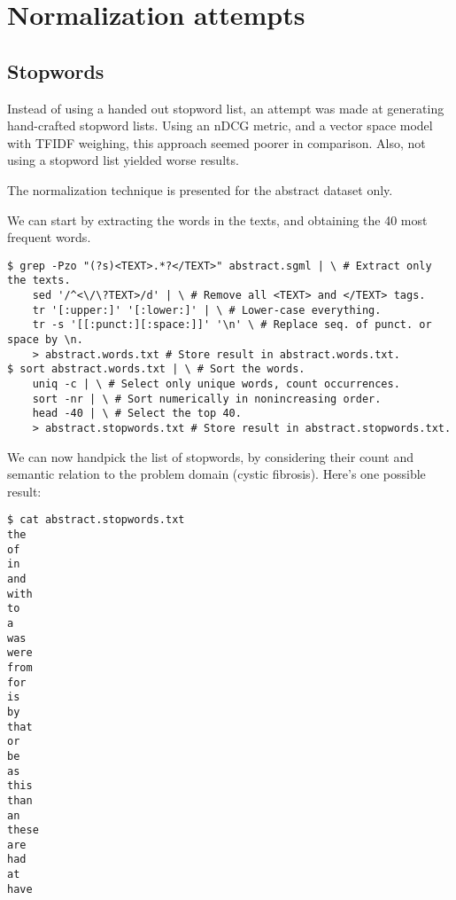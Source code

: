 
\section{Normalization attempts}

\subsection{Stopwords}

Instead of using a handed out stopword list, an attempt was made at generating
hand-crafted stopword lists. Using an nDCG metric, and a vector space model
with TFIDF weighing, this approach seemed poorer in comparison. Also, not using
a stopword list yielded worse results.

The normalization technique is presented for the abstract dataset only.

We can start by extracting the words in the texts, and obtaining the 40 most
frequent words.


\begin{lstlisting}
$ grep -Pzo "(?s)<TEXT>.*?</TEXT>" abstract.sgml | \ # Extract only the texts.
    sed '/^<\/\?TEXT>/d' | \ # Remove all <TEXT> and </TEXT> tags.
    tr '[:upper:]' '[:lower:]' | \ # Lower-case everything.
    tr -s '[[:punct:][:space:]]' '\n' \ # Replace seq. of punct. or space by \n.
    > abstract.words.txt # Store result in abstract.words.txt.
$ sort abstract.words.txt | \ # Sort the words.
    uniq -c | \ # Select only unique words, count occurrences.
    sort -nr | \ # Sort numerically in nonincreasing order.
    head -40 | \ # Select the top 40.
    > abstract.stopwords.txt # Store result in abstract.stopwords.txt.
\end{lstlisting}

We can now handpick the list of stopwords, by considering their count and
semantic relation to the problem domain (cystic fibrosis). Here's one possible
result:

\begin{lstlisting}
$ cat abstract.stopwords.txt 
the
of
in
and
with
to
a
was
were
from
for
is
by
that
or
be
as
this
than
an
these
are
had
at
have
\end{lstlisting}

